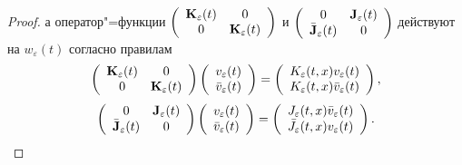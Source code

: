\begin{proof}
а оператор"=функции $\left(
\begin{array}{cc}
{\bf K}_{\varepsilon }(t) & 0\\
0 & { \bf K}_{\varepsilon }(t)
\end{array} \right)$ и $\left(
\begin{array}{cc}
0 & {{\bf J}_{\varepsilon }(t)}\\
{\bar {\bf J}_{\varepsilon }(t)} & 0
\end{array} \right)$ действуют на $w_{\varepsilon }(t)$ согласно правилам
$$
\left(
\begin{array}{cc}
{\bf K}_{\varepsilon  }(t) & 0\\
0 & { \bf K}_{\varepsilon }(t)
\end{array} \right)\left(
\begin{array}{c}
v_{\varepsilon }(t)\\
\bar v_{\varepsilon }(t)
\end{array} \right) =\left(
\begin{array}{c}
K_{\varepsilon }(t,x)v_{\varepsilon }(t)\\
 K_{\varepsilon 
}(t,x)\bar v_{\varepsilon }(t)
\end{array} \right),
$$
$$\left(
\begin{array}{cc}
0 & {{\bf J}_{\varepsilon  }(t)}\\
{\bar {\bf J}_{\varepsilon }(t)} & 0
\end{array} \right)\left(
\begin{array}{c}
v_{\varepsilon }(t)\\
\bar v_{\varepsilon }(t)
\end{array} \right)=\left(
\begin{array}{c}
J_{\varepsilon }(t,x)\bar v_{\varepsilon }(t)\\
 \bar J_{\varepsilon }(t,x)v_{\varepsilon }(t)
\end{array} \right) .
$$


\end{proof}
